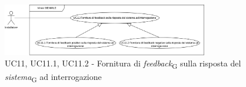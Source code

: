 \begin{figure}[H]
\centering
\includegraphics[width=0.8\textwidth]{contents/casi_duso/png/UC11.png}
\caption{UC11, UC11.1, UC11.2 - Fornitura di \textit{feedback}\textsubscript{G} sulla risposta del \textit{sistema}\textsubscript{G} ad interrogazione}
\end{figure}

